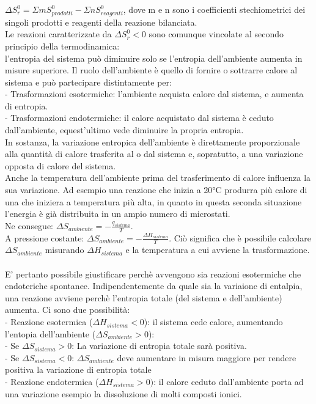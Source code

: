 $\Delta S_r^0 = \Sigma mS^0_{prodotti} - \Sigma nS^0_{reagenti}$, dove m e n sono i coefficienti stechiometrici dei singoli prodotti e reagenti della reazione bilanciata.\\
Le reazioni caratterizzate da $\Delta S_r^0 < 0$ sono comunque vincolate al secondo principio della termodinamica:\\
l'entropia del sistema può diminuire solo se l'entropia dell'ambiente aumenta in misure superiore. Il ruolo dell'ambiente è quello di fornire o sottrarre calore al sistema e può partecipare distintamente per:\\
\tab- Trasformazioni esotermiche: l'ambiente acquista calore dal sistema, e aumenta di entropia.\\
\tab- Trasformazioni endotermiche: il calore acquistato dal sistema è ceduto dall'ambiente, equest'ultimo vede diminuire la propria entropia.\\
In sostanza, la variazione entropica dell'ambiente è direttamente proporzionale alla quantità di calore trasferita al o dal sistema e, sopratutto, a una variazione opposta di calore del sistema.\\
Anche la temperatura dell'ambiente prima del trasferimento di calore influenza la sua variazione. Ad esempio una reazione che inizia a 20°C produrra più calore di una che iniziera a temperatura più alta, in quanto in questa seconda situazione l'energia è già distribuita in un ampio numero di microstati.\\
Ne consegue: $\Delta S_{ambiente} = -\frac{q_{sistema}}{T}$.\\
A pressione costante: $\Delta S_{ambiente} = -\frac{\Delta H_{sistema}}{T}$. Ciò significa che è possibile calcolare $\Delta S_{ambiente}$ misurando $\Delta H_{sistema}$ e la temperatura a cui avviene la trasformazione.\\\\
E' pertanto possibile giustificare perchè avvengono sia reazioni esotermiche che endoteriche spontanee. Indipendentemente da quale sia la variaione di entalpia, una reazione avviene perchè l'entropia totale (del sistema e dell'ambiente) aumenta. Ci sono due possibilità:\\
\tab- Reazione esotermica ($\Delta H_{sistema} < 0$): il sistema cede calore, aumentando l'entopia dell'ambiente ($\Delta S_{ambiente} > 0$):\\
\tab\tab- Se $\Delta S_{sistema} > 0$: La variazione di entropia totale sarà positiva.\\
\tab\tab- Se $\Delta S_{sistema} < 0$: $\Delta S_{ambiente}$ deve aumentare in misura maggiore per rendere positiva la variazione di entropia totale\\
\tab- Reazione endotermica ($\Delta H_{sistema} > 0)$: il calore ceduto dall'ambiente porta ad una variazione esempio la dissoluzione di molti composti ionici.
